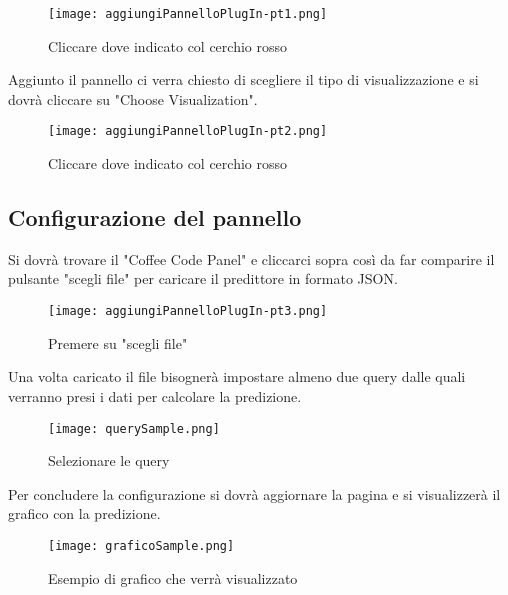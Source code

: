 \documentclass[../manuale-utente.tex]{subfiles}
\begin{document}
\begin{figure}[h!]
  \begin{center}
    \texttt{[image: aggiungiPannelloPlugIn-pt1.png]}\\
    \caption{Cliccare dove indicato col cerchio rosso}%
    \label{fig:aggiungi-pannello}
  \end{center}
\end{figure}

Aggiunto il pannello ci verra chiesto di scegliere il tipo di visualizzazione e si dovrà cliccare su "Choose Visualization".

\begin{figure}[h!]
  \begin{center}
    \texttt{[image: aggiungiPannelloPlugIn-pt2.png]}\\
    \caption{Cliccare dove indicato col cerchio rosso}%
    \label{fig:scegliere-la-visualizzazione}
  \end{center}
\end{figure}

\newpage
\subsection{Configurazione del pannello}

Si dovrà trovare il "Coffee Code Panel" e cliccarci sopra così da far comparire il pulsante "scegli file" per caricare il predittore in formato JSON.

\begin{figure}[h!]
    \begin{center}
      \texttt{[image: aggiungiPannelloPlugIn-pt3.png]}\\
      \caption{Premere su "scegli file"}%
      \label{fig:scelta-del-file}
    \end{center}
  \end{figure}

Una volta caricato il file bisognerà impostare almeno due query dalle quali verranno presi i dati per calcolare la predizione.

\begin{figure}[h!]
    \begin{center}
      \texttt{[image: querySample.png]}\\
      \caption{Selezionare le query}%
      \label{fig:selezionare-le-query}
    \end{center}
  \end{figure}
  \newpage
Per concludere la configurazione si dovrà aggiornare la pagina e si visualizzerà il grafico con la predizione.

\begin{figure}[h!]
    \begin{center}
      \texttt{[image: graficoSample.png]}\\
      \caption{Esempio di grafico che verrà visualizzato}%
      \label{fig:esempio-grafico}
    \end{center}
  \end{figure}
\end{document}
